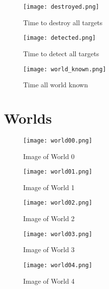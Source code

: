 \begin{figure}[H]
	\centering
	\texttt{[image: destroyed.png]}
	\caption{Time to destroy all targets}
	\label{fig:time_to_destroy}
\end{figure}

\begin{figure}[H]
	\centering
	\texttt{[image: detected.png]}
	\caption{Time to detect all targets}
	\label{fig:time_to_detect}
\end{figure}

\begin{figure}[H]
	\centering
	\texttt{[image: world\_known.png]}
	\caption{Time all world known}
	\label{fig:time_all_world_known}
\end{figure}


\chapter{Worlds}
\label{sec:world_images}
\begin{figure}[H]
	\centering
	\texttt{[image: world00.png]}
	\caption{Image of World 0}
	\label{fig:world0}
\end{figure}

\begin{figure}[H]
	\centering
	\texttt{[image: world01.png]}
	\caption{Image of World 1}
	\label{fig:world1}
\end{figure}

\begin{figure}[H]
	\centering
	\texttt{[image: world02.png]}
	\caption{Image of World 2}
	\label{fig:world2}
\end{figure}

\begin{figure}[H]
	\centering
	\texttt{[image: world03.png]}
	\caption{Image of World 3}
	\label{fig:world3}
\end{figure}

\begin{figure}[H]
	\centering
	\texttt{[image: world04.png]}
	\caption{Image of World 4}
	\label{fig:world4}
\end{figure}

